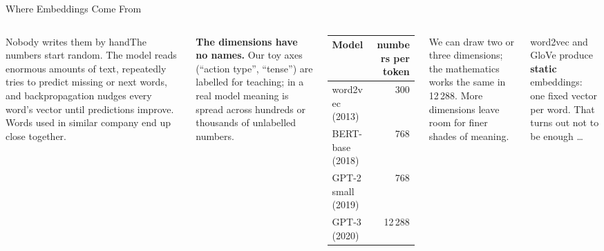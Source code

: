 \documentclass[aspectratio=169,10pt]{beamer}
\begin{document}
\begin{frame}{Where Embeddings Come From}
\begin{columns}[T]
\begin{cbox}{Nobody writes them by hand}\scriptsize The numbers start random. The model reads enormous amounts of text, repeatedly tries to predict missing or next words, and backpropagation nudges every word's vector until predictions improve. Words used in similar company end up close together.\end{cbox}
\begin{wbox}\scriptsize\textbf{The dimensions have no names.} Our toy axes (``action type'', ``tense'') are labelled for teaching; in a real model meaning is spread across hundreds or thousands of unlabelled numbers.\end{wbox}
\centering\scriptsize\renewcommand{\arraystretch}{1.25}
\begin{tabular}{lr}
\toprule
\textbf{Model}&\textbf{numbers per token}\\\midrule
word2vec (2013)&300\\
BERT-base (2018)&768\\
GPT-2 small (2019)&768\\
GPT-3 (2020)&12\,288\\\bottomrule
\end{tabular}
\vspace{4pt}
\raggedright
\begin{rbox}\scriptsize We can draw two or three dimensions; the mathematics works the same in 12\,288. More dimensions leave room for finer shades of meaning.\end{rbox}
\begin{ibox}\scriptsize word2vec and GloVe produce \textbf{static} embeddings: one fixed vector per word. That turns out not to be enough \dots\end{ibox}
\end{columns}
\end{frame}
\end{document}
